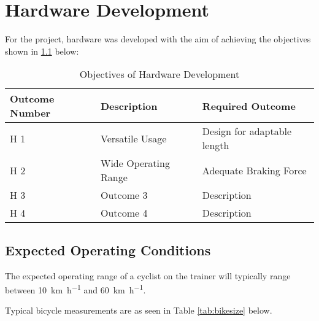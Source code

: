 
\chapter{Hardware Development}

\color{red} %

For the project, hardware was developed with the aim of achieving the objectives shown in \ref{tab:devgoals} below:

\begin{table}[H]
	\color{red} %
	\renewcommand{\arraystretch}{1.2}
	\centering
	\caption{Objectives of Hardware Development}
	\begin{tabularx}{\textwidth}{p{2cm} >{\raggedright}p{5cm} >{\raggedright\arraybackslash}X}
		\toprule
		Outcome Number & Description          & Required Outcome            \\
		\midrule
		H 1            & Versatile Usage      & Design for adaptable length \\
		H 2            & Wide Operating Range & Adequate Braking Force      \\
		H 3            & Outcome 3            & Description                 \\
		H 4            & Outcome 4            & Description                 \\
		\bottomrule
	\end{tabularx}
	\label{tab:devgoals}
\end{table}

\color{black}
\newpage

\section{Expected Operating Conditions}
\color{red} %

The expected operating range of a cyclist on the trainer will typically range between \SI{10}{\kilo\meter\per\hour} and \SI{60}{\kilo\meter\per\hour}.

Typical bicycle measurements are as seen in Table \ref{tab:bikesize} below.

